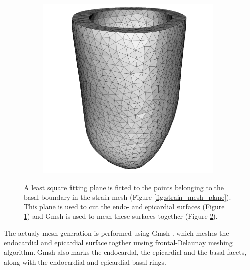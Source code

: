 \begin{figure}[htbp]
\begin{subfigure}[t]{0.36\textwidth}
    \caption{\label{fig:cut_intro}}
  \end{subfigure}
  \begin{subfigure}[t]{0.32\textwidth}
    \includegraphics[width=\textwidth]{chapters/introduction/figures/geometry/mesh.png}
    \caption{\label{fig:mesh_intro}}
  \end{subfigure}
\caption{A least square fitting plane is fitted to the points
  belonging to the basal boundary in the strain mesh (Figure
  \ref{fig:strain_mesh_plane}). This plane is used to cut the endo- and
  epicardial surfaces (Figure \ref{fig:cut_intro}) and Gmsh is used to mesh
  these surfaces together (Figure \ref{fig:mesh_intro}). }
\label{fig:mesh_generation_intro}
\end{figure}



The actualy mesh generation is performed using Gmsh
\cite{geuzaine2009gmsh}, which meshes the endocardial and epicardial
surface togther unsing frontal-Delaunay meshing algorithm. Gmsh also marks
the endocardal, the epicardial  and the basal facets, along with the
endocardial and epicardial basal rings. 

  



